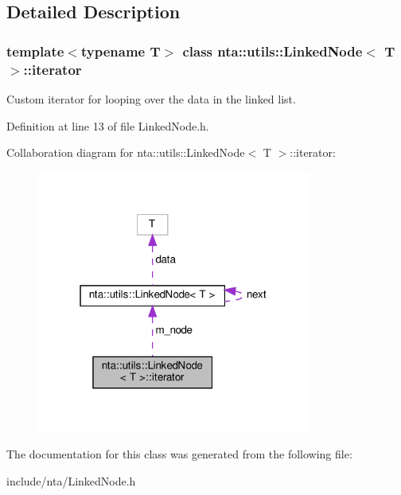 \subsection{Detailed Description}
\subsubsection*{template$<$typename T$>$\newline
class nta\+::utils\+::\+Linked\+Node$<$ T $>$\+::iterator}

Custom iterator for looping over the data in the linked list. 

Definition at line 13 of file Linked\+Node.\+h.



Collaboration diagram for nta\+:\+:utils\+:\+:Linked\+Node$<$ T $>$\+:\+:iterator\+:\nopagebreak
\begin{figure}[H]
\begin{center}
\leavevmode
\includegraphics[width=256pt]{da/d2f/classnta_1_1utils_1_1LinkedNode_1_1iterator__coll__graph}
\end{center}
\end{figure}


The documentation for this class was generated from the following file\+:\begin{DoxyCompactItemize}
\item 
include/nta/Linked\+Node.\+h\end{DoxyCompactItemize}
